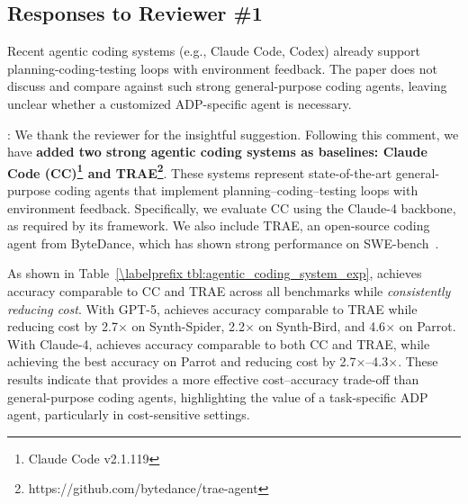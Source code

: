 \subsection*{Responses to Reviewer \#1 %
}
\label{cover_letter:r1}

\begin{shaded}
{
 Recent agentic coding systems (e.g., Claude Code, Codex) already support planning-coding-testing loops with environment feedback. The paper does not discuss and compare against such strong general-purpose coding agents, leaving unclear whether a customized ADP-specific agent is necessary.
}
\end{shaded}

% 


:
We thank the reviewer for the insightful suggestion.
Following this comment, we have \textbf{added two strong agentic coding systems as baselines: Claude Code (CC)\footnote{Claude Code v2.1.119} and TRAE\footnote{https://github.com/bytedance/trae-agent}}. These systems represent state-of-the-art general-purpose coding agents that implement planning–coding–testing loops with environment feedback. Specifically, we evaluate CC using the Claude-4 backbone, as required by its framework. We also include TRAE, an open-source coding agent from ByteDance, which has shown strong performance on SWE-bench~\cite{jimenez2024swe}.


As shown in Table~\ref{\labelprefix tbl:agentic_coding_system_exp}, \sys achieves accuracy comparable to CC and TRAE across all benchmarks while \emph{consistently reducing cost}. With GPT-5, \sys achieves accuracy comparable to TRAE while reducing cost by 2.7$\times$ on Synth-Spider, 2.2$\times$ on Synth-Bird, and 4.6$\times$ on Parrot. With Claude-4, \sys achieves accuracy comparable to both CC and TRAE, while achieving the best accuracy on Parrot and reducing cost by 2.7$\times$–4.3$\times$. These results indicate that \sys provides a more effective cost–accuracy trade-off than general-purpose coding agents, highlighting the value of a task-specific ADP agent, particularly in cost-sensitive settings.

